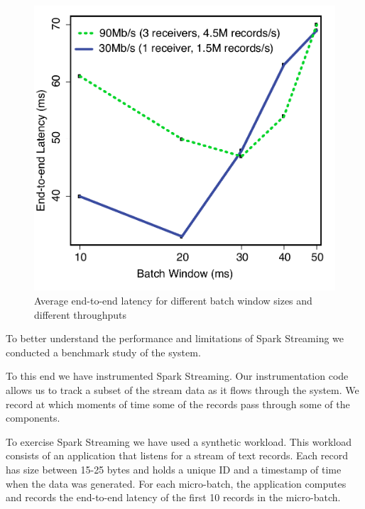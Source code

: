 \begin{figure}[t!]
  \begin{center}
    \includegraphics[scale=0.35]{images_graphs/batchsize_vs_latency/batchsize_vs_latency_illustrator.pdf}
  \end{center}
  \caption{Average end-to-end latency for different batch window sizes and different throughputs}
  \label{fig:Batchsize_vs_latency}
\end{figure}



To better understand the performance and limitations of Spark Streaming we conducted a benchmark study of the system.

To this end we have instrumented Spark Streaming.
Our instrumentation code allows us to track a subset of the stream data as it flows through the system.
We record at which moments of time some of the records pass through some of the components.

To exercise Spark Streaming we have used a synthetic workload.
This workload consists of an application that listens for a stream of text records.
Each record has size between 15-25 bytes and holds a unique ID and a timestamp of time when the data was generated.
For each micro-batch, the application computes and records the end-to-end latency of the first 10 records in the micro-batch.

